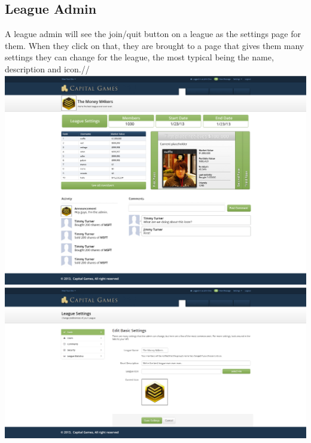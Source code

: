\subsection{League Admin}
A league admin will see the join/quit button on a league as the settings page for them. When they click on that, they are brought to a page that gives them many settings they can change for the league, the most typical being the name, description and icon.//
\includegraphics{./mockups/JPEG/Leagues_admin.jpg}
\includegraphics{./mockups/JPEG/league_admin.jpg}


